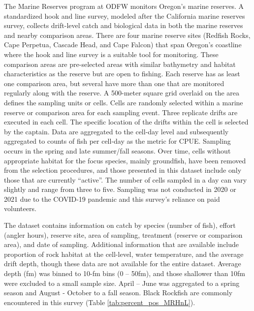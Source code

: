 \documentclass[11pt,
  letterpaper,
]{article}
\begin{document}
The Marine Reserves program at ODFW monitors Oregon's marine reserves. A standardized hook and line survey, modeled after the California marine reserves survey, collects drift-level catch and biological data in both the marine reserves and nearby comparison areas. There are four marine reserve sites (Redfish Rocks, Cape Perpetua, Cascade Head, and Cape Falcon) that span Oregon's coastline where the hook and line survey is a suitable tool for monitoring. These comparison areas are pre-selected areas with similar bathymetry and habitat characteristics as the reserve but are open to fishing. Each reserve has as least one comparison area, but several have more than one that are monitored regularly along with the reserve. A 500-meter square grid overlaid on the area defines the sampling units or cells. Cells are randomly selected within a marine reserve or comparison area for each sampling event. Three replicate drifts are executed in each cell. The specific location of the drifts within the cell is selected by the captain. Data are aggregated to the cell-day level and subsequently aggregated to counts of fish per cell-day as the metric for CPUE. Sampling occurs in the spring and late summer/fall seasons. Over time, cells without appropriate habitat for the focus species, mainly groundfish, have been removed from the selection procedures, and those presented in this dataset include only those that are currently ``active''. The number of cells sampled in a day can vary slightly and range from three to five. Sampling was not conducted in 2020 or 2021 due to the COVID-19 pandemic and this survey's reliance on paid volunteers.

The dataset contains information on catch by species (number of fish), effort (angler hours), reserve site, area of sampling, treatment (reserve or comparison area), and date of sampling. Additional information that are available include proportion of rock habitat at the cell-level, water temperature, and the average drift depth, though these data are not available for the entire dataset. Average depth (fm) was binned to 10-fm bins (0 -- 50fm), and those shallower than 10fm were excluded to a small sample size. April -- June was aggregated to a spring season and August - October to a fall season. Black Rockfish are commonly encountered in this survey (Table \ref{tab:percent_pos_MRHnL}).
\end{document}
